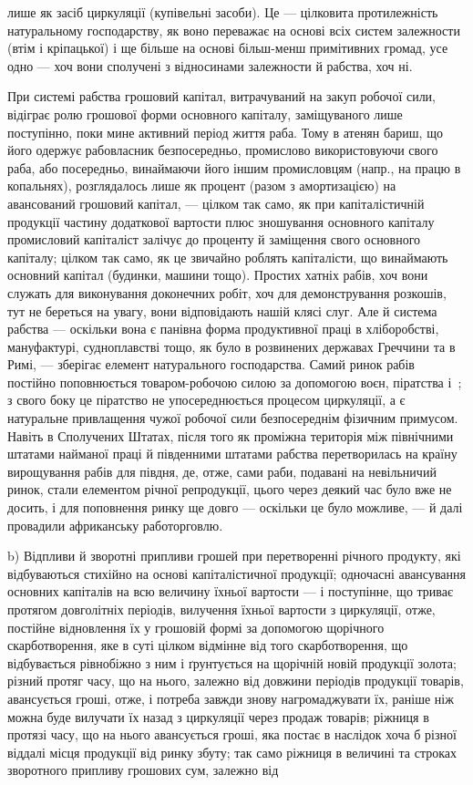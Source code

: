\parcont{}  %
лише як засіб циркуляції (купівельні засоби). Це — цілковита протилежність
натуральному господарству, як воно переважає на основі всіх систем
залежности (втім і кріпацької) і ще більше на основі більш-менш примітивних
громад, усе одно — хоч вони сполучені з відносинами залежности
й рабства, хоч ні.

При системі рабства грошовий капітал, витрачуваний на закуп робочої
сили, відіграє ролю грошової форми основного капіталу, заміщуваного
лише поступінно, поки мине активний період життя раба. Тому
в атенян бариш, що його одержує рабовласник безпосередньо, промислово
використовуючи свого раба, або посередньо, винаймаючи його іншим
промисловцям (напр., на працю в копальнях), розглядалось лише як
процент (разом з амортизацією) на авансований грошовий капітал, —
цілком так само, як при капіталістичній продукції частину додаткової
вартости плюс зношування основного капіталу промисловий капіталіст залічує
до проценту й заміщення свого основного капіталу; цілком так само, як
це звичайно роблять капіталісти, що винаймають основний капітал (будинки,
машини тощо). Простих хатніх рабів, хоч вони служать для виконування
доконечних робіт, хоч для демонстрування розкошів, тут не береться на
увагу, вони відповідають нашій клясі слуг. Але й система рабства —
оскільки вона є панівна форма продуктивної праці в хліборобстві, мануфактурі,
судноплавстві тощо, як було в розвинених державах Греччини та
в Римі, — зберігає елемент натурального господарства. Самий ринок
рабів постійно поповнюється товаром-робочою силою за допомогою воєн,
піратства і~; з свого боку це піратство не упосереднюється процесом
циркуляції, а є натуральне привлащення чужої робочої сили
безпосереднім фізичним примусом. Навіть в Сполучених Штатах, після
того як проміжна територія між північними штатами найманої праці й
південними штатами рабства перетворилась на країну вирощування рабів
для півдня, де, отже, сами раби, подавані на невільничий ринок, стали
елементом річної репродукції, цього через деякий час було вже не досить,
і для поповнення ринку ще довго — оскільки це було можливе, — й
далі провадили африканську работорговлю.

\roztyagnut{}
b) Відпливи й зворотні припливи грошей при перетворенні річного
продукту, які відбуваються стихійно на основі капіталістичної продукції;
одночасні авансування основних капіталів на всю величину їхньої вартости
— і поступінне, що триває протягом довголітніх періодів, вилучення
їхньої вартости з циркуляції, отже, постійне відновлення їх у грошовій
формі за допомогою щорічного скарботворення, яке в суті цілком
відмінне від того скарботворення, що відбувається рівнобіжно з ним і
ґрунтується на щорічній новій продукції золота; різний протяг часу, що
на нього, залежно від довжини періодів продукції товарів, авансується
гроші, отже, і потреба завжди знову нагромаджувати їх, раніше ніж
можна буде вилучати їх назад з циркуляції через продаж товарів; ріжниця
в протязі часу, що на нього авансується гроші, яка постає в наслідок
хоча б різної віддалі місця продукції від ринку збуту; так само ріжниця
в величині та строках зворотного припливу грошових сум, залежно від
\parbreak{}  %
